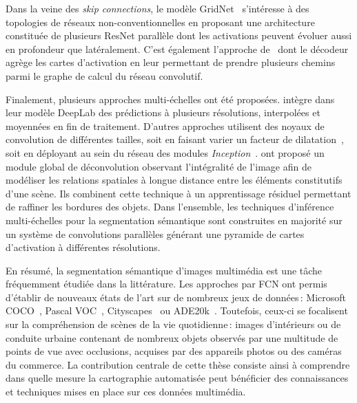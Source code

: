 Dans la veine des \emph{skip connections}, le modèle GridNet~\cite{fourure_residual_2017} s'intéresse à des topologies de réseaux non-conventionnelles en proposant une architecture constituée de plusieurs ResNet parallèle dont les activations peuvent évoluer aussi en profondeur que latéralement. C'est également l'approche de~\citet{liu_path_2018} dont le décodeur agrège les cartes d'activation en leur permettant de prendre plusieurs chemins parmi le graphe de calcul du réseau convolutif.

Finalement, plusieurs approches multi-échelles ont été proposées. \citet{l._c._chen_deeplab_2018} intègre dans leur modèle DeepLab des prédictions à plusieurs résolutions, interpolées et moyennées en fin de traitement. D'autres approches utilisent des noyaux de convolution de différentes tailles, soit en faisant varier un facteur de dilatation~\cite{yu_multi-scale_2015}, soit en déployant au sein du réseau des modules \emph{Inception}~\cite{szegedy_going_2015,nekrasov_global_2016,zhao_pyramid_2017}. \citet{peng_large_2017} ont proposé un module global de déconvolution observant l'intégralité de l'image afin de modéliser les relations spatiales à longue distance entre les éléments constitutifs d'une scène. Ils combinent cette technique à un apprentissage résiduel permettant de raffiner les bordures des objets. Dans l'ensemble, les techniques d'inférence multi-échelles pour la segmentation sémantique sont construites en majorité sur un système de convolutions parallèles générant une pyramide de cartes d'activation à différentes résolutions.

En résumé, la segmentation sémantique d'images multimédia est une tâche fréquemment étudiée dans la littérature. Les approches par \gls{FCN} ont permis d'établir de nouveaux états de l'art sur de nombreux jeux de données\,: Microsoft COCO~\cite{lin_microsoft_2014}, Pascal VOC~\cite{everingham_pascal_2014}, Cityscapes~\cite{cordts_cityscapes_2016} ou ADE20k~\cite{zhou_scene_2017}. Toutefois, ceux-ci se focalisent sur la compréhension de scènes de la vie quotidienne\,: images d'intérieurs ou de conduite urbaine contenant de nombreux objets observés par une multitude de points de vue avec occlusions, acquises par des appareils photos ou des caméras du commerce. La contribution centrale de cette thèse consiste ainsi à comprendre dans quelle mesure la cartographie automatisée peut bénéficier des connaissances et techniques mises en place sur ces données multimédia.

